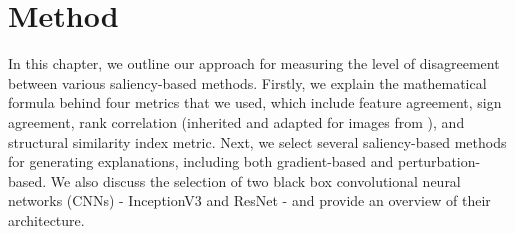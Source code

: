 \chapter{Method}
\label{ch:proposedMethod}
In this chapter, we outline our approach for measuring the level of disagreement between various saliency-based methods. Firstly, we explain the mathematical formula behind four metrics that we used, which include feature agreement, sign agreement, rank correlation (inherited and adapted for images from \cite{krishna_disagreement_problem}), and structural similarity index metric. Next, we select several saliency-based methods for generating explanations, including both gradient-based and perturbation-based. We also discuss the selection of two black box convolutional neural networks (CNNs) - InceptionV3 and ResNet - and provide an overview of their architecture.



